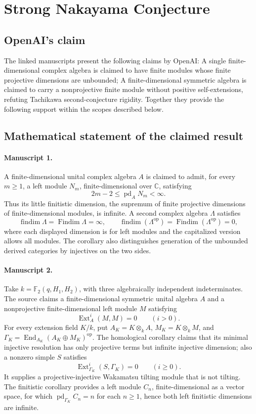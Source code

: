 \documentclass[11pt]{article}
\begin{document}
\section*{Strong Nakayama Conjecture}

\subsection{OpenAI's claim}
The linked manuscripts present the following claims by OpenAI: A single finite-dimensional complex algebra is claimed to have finite modules whose finite projective dimensions are unbounded; A finite-dimensional symmetric algebra is claimed to carry a nonprojective finite module without positive self-extensions, refuting Tachikawa second-conjecture rigidity. Together they provide the following support within the scopes described below.

\subsection{Mathematical statement of the claimed result}
\paragraph{Manuscript 1.}
A finite-dimensional unital complex algebra \(A\) is claimed to admit, for every \(m\ge1\), a left module \(N_m\), finite-dimensional over \(\mathbb C\), satisfying
\[
 2m-2\le\operatorname{pd}_AN_m<\infty.
\]
Thus its little finitistic dimension, the supremum of finite projective dimensions of finite-dimensional modules, is infinite. A second complex algebra \(\Lambda\) satisfies
\[
 \operatorname{findim}\Lambda=\operatorname{Findim}\Lambda=\infty,
 \qquad
 \operatorname{findim}(\Lambda^{\mathrm{op}})
 =\operatorname{Findim}(\Lambda^{\mathrm{op}})=0,
\]
where each displayed dimension is for left modules and the capitalized version allows all modules. The corollary also distinguishes generation of the unbounded derived categories by injectives on the two sides.

\paragraph{Manuscript 2.}
Take \(k=\mathbb F_2(q,H_1,H_2)\), with three algebraically independent indeterminates. The source claims a finite-dimensional symmetric unital algebra \(A\) and a nonprojective finite-dimensional left module \(M\) satisfying
\[
 \operatorname{Ext}^i_A(M,M)=0\qquad(i>0).
\]
For every extension field \(K/k\), put \(A_K=K\otimes_kA\), \(M_K=K\otimes_kM\), and \(\Gamma_K=\operatorname{End}_{A_K}(A_K\oplus M_K)^{\mathrm{op}}\). The homological corollary claims that its minimal injective resolution has only projective terms but infinite injective dimension; also a nonzero simple \(S\) satisfies
\[
 \operatorname{Ext}^i_{\Gamma_K}(S,\Gamma_K)=0\qquad(i\ge0).
\]
It supplies a projective-injective Wakamatsu tilting module that is not tilting. The finitistic corollary provides a left module \(C_n\), finite-dimensional as a vector space, for which \(\operatorname{pd}_{\Gamma_K}C_n=n\) for each \(n\ge1\), hence both left finitistic dimensions are infinite.
\end{document}
